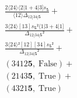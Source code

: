 \documentclass[varwidth, border=5pt]{standalone}
\begin{document}
\begin{my}
$\begin{gathered}
\scriptscriptstyle\frac{2⟨24⟩⟨2|1+4|3]s_{𝟓}}{⟨12⟩Δ_{12|34|𝟓}} +\\
\scriptscriptstyle\frac{3⟨24⟩[13]s_{𝟓}²⟨1|3+4|1]}{Δ_{12|34|𝟓}²} +\\
\scriptscriptstyle\frac{3⟨24⟩²[12][34]s_{𝟓}²}{Δ_{12|34|𝟓}²} +\\
\scriptscriptstyle(3412𝟓,\;\text{False}) +\\
\scriptscriptstyle(2143𝟓,\;\text{True}) +\\
\scriptscriptstyle(4321𝟓,\;\text{True}) \phantom{+}
\end{gathered}$
\end{my}
\end{document}
